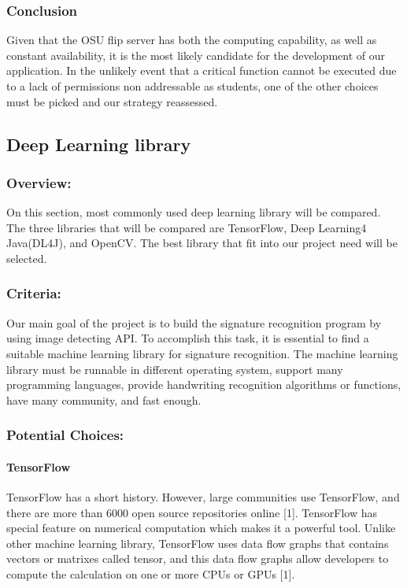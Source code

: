 \documentclass[article, onecolumn, draftclsnofoot,10pt, compsoc]{IEEEtran}
\begin{document}
\subsubsection{Conclusion}
Given that the OSU flip server has both the computing capability, as well as constant availability, it is the most likely candidate for the development of our application. In the unlikely event that a critical function cannot be executed due to a lack of permissions non addressable as students, one of the other choices must be picked and our strategy reassessed. 

\subsection{Deep Learning library}
\subsubsection{Overview:}
On this section, most commonly used deep learning library will be compared. The three libraries that will be compared are TensorFlow, Deep Learning4 Java(DL4J), and OpenCV. The best library that fit into our project need will be selected.

\subsubsection{Criteria:}
Our main goal of the project is to build the signature recognition program by using image detecting API. To accomplish this task, it is essential to find a suitable machine learning library for signature recognition. The machine learning library must be runnable in different operating system, support many programming languages, provide handwriting recognition algorithms or functions, have many community, and fast enough. 

\subsubsection{Potential Choices:}
\paragraph{TensorFlow}
TensorFlow has a short history. However, large communities use TensorFlow, and there are more than 6000 open source repositories online [1]. TensorFlow has special feature on numerical computation which makes it a powerful tool. Unlike other machine learning library, TensorFlow uses data flow graphs that contains vectors or matrixes called tensor, and this data flow graphs allow developers to compute the calculation on one or more CPUs or GPUs [1].
\end{document}
